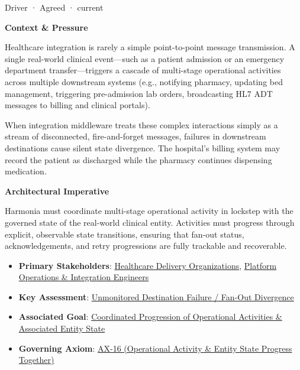 \label{element:b3fb294d95024e4382b2c251c389fa66}
{\small Driver · Agreed · current}\par

\par\medskip\textbf{Context \& Pressure}\par


Healthcare integration is rarely a simple point-to-point message transmission. A single real-world clinical event—such as a patient admission or an emergency department transfer—triggers a cascade of multi-stage operational activities across multiple downstream systems (e.g., notifying pharmacy, updating bed management, triggering pre-admission lab orders, broadcasting HL7 ADT messages to billing and clinical portals).



When integration middleware treats these complex interactions simply as a stream of disconnected, fire-and-forget messages, failures in downstream destinations cause silent state divergence. The hospital's billing system may record the patient as discharged while the pharmacy continues dispensing medication.



\par\medskip\textbf{Architectural Imperative}\par


Harmonia must coordinate multi-stage operational activity in lockstep with the governed state of the real-world clinical entity. Activities must progress through explicit, observable state transitions, ensuring that fan-out status, acknowledgements, and retry progressions are fully trackable and recoverable.



\begin{itemize}


\item \textbf{Primary Stakeholders}: \href{\detokenize{../../../../../../../../docs/markdown/01-motivation/stakeholders/enterprise-stakeholders.md}}{Healthcare Delivery Organizations}, \href{\detokenize{../../../../../../../../docs/markdown/01-motivation/stakeholders/enterprise-stakeholders.md}}{Platform Operations \& Integration Engineers}

\item \textbf{Key Assessment}: \href{\detokenize{../../../../../../../../docs/markdown/01-motivation/drivers-assessments/assessments.md}}{Unmonitored Destination Failure / Fan-Out Divergence}

\item \textbf{Associated Goal}: \href{\detokenize{../../../../../../../../docs/markdown/01-motivation/goals-outcomes/strategic-goals.md}}{Coordinated Progression of Operational Activities \& Associated Entity State}

\item \textbf{Governing Axiom}: \hyperref[element:de7e90f46127455a9ec9ad3b9b48ba54]{AX-16 (Operational Activity \& Entity State Progress Together)}

\end{itemize}

